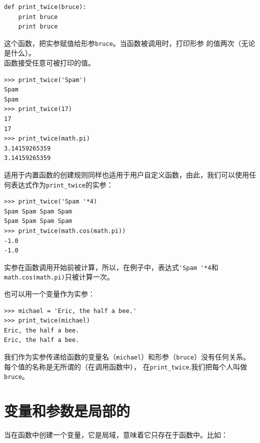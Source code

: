 
\beforeverb
\begin{verbatim}
def print_twice(bruce):
    print bruce
    print bruce
\end{verbatim}
\afterverb

这个函数，把实参赋值给形参{\tt bruce}。当函数被调用时，打印形参
的值两次（无论是什么）。\\

函数接受任意可被打印的值。

\beforeverb
\begin{verbatim}
>>> print_twice('Spam')
Spam
Spam
>>> print_twice(17)
17
17
>>> print_twice(math.pi)
3.14159265359
3.14159265359
\end{verbatim}
\afterverb

适用于内置函数的创建规则同样也适用于用户自定义函数，由此，我们可以使用任何表达式作为\verb"print_twice"的实参：


\beforeverb
\begin{verbatim}
>>> print_twice('Spam '*4)
Spam Spam Spam Spam
Spam Spam Spam Spam
>>> print_twice(math.cos(math.pi))
-1.0
-1.0
\end{verbatim}
\afterverb


实参在函数调用开始前被计算，所以，在例子中，表达式\verb"'Spam '*4"和{\tt math.cos(math.pi)}只被计算一次。\\


也可以用一个变量作为实参：

\beforeverb
\begin{verbatim}
>>> michael = 'Eric, the half a bee.'
>>> print_twice(michael)
Eric, the half a bee.
Eric, the half a bee.
\end{verbatim}
\afterverb


我们作为实参传递给函数的变量名（{\tt michael}）和形参（{\tt bruce}）没有任何关系。每个值的名称是无所谓的（在调用函数中），
在\verb"print_twice",我们把每个人叫做{\tt bruce}。

\section{变量和参数是局部的}

当在函数中创建一个变量，它是局域，意味着它只存在于函数中。比如：


